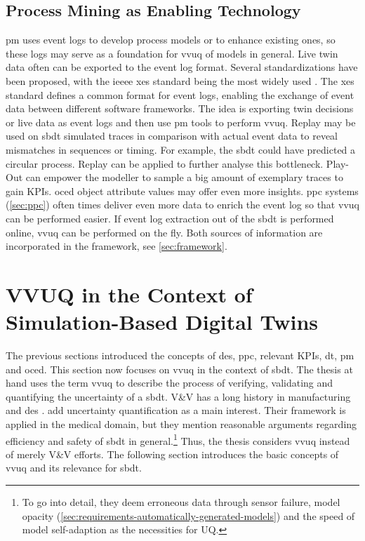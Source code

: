 \subsection{Process Mining as Enabling Technology}
\label{sec:process-mining-enabling-technology}

\gls{pm} uses event logs to develop process models or to enhance existing ones, so these logs may serve as a foundation for \gls{vvuq} of models in general. Live twin data often can be exported to the event log format. Several standardizations have been proposed, with the \gls{ieeee} \gls{xes} standard being the most widely used \autocite{van2016data}. The \gls{xes} standard defines a common format for event logs, enabling the exchange of event data between different software frameworks. The idea is exporting twin decisions or live data as event logs and then use \gls{pm} tools to perform \gls{vvuq}.
Replay may be used on \gls{sbdt} simulated traces in comparison with actual event data to reveal mismatches in sequences or timing. For example, the \gls{sbdt} could have predicted a circular process. Replay can be applied to further analyse this bottleneck. Play-Out can empower the modeller to sample a big amount of exemplary traces to gain KPIs. \gls{oced} object attribute values may offer even more insights.
\gls{ppc} systems (\autoref{sec:ppc}) often times deliver even more data to enrich the event log so that \gls{vvuq} can be performed easier. If event log extraction out of the \gls{sbdt} is performed online, \gls{vvuq} can be performed on the fly. Both sources of information are incorporated in the framework, see \autoref{sec:framework}.

\section{VVUQ in the Context of Simulation-Based Digital Twins}
\label{sec:vvuq-sbdt}

The previous sections introduced the concepts of \gls{des}, \gls{ppc}, relevant KPIs, \gls{dt}, \gls{pm} and \gls{oced}. This section now focuses on \gls{vvuq} in the context of \gls{sbdt}. The thesis at hand uses the term \gls{vvuq} to describe the process of verifying, validating and quantifying the uncertainty of a \gls{sbdt}. V\&V has a long history in manufacturing and \gls{des} \autocite{Bitencourt2023}. \Textcite{sel2025survey} add uncertainty quantification as a main interest. Their framework is applied in the medical domain, but they mention reasonable arguments regarding efficiency and safety of \gls{sbdt} in general.\footnote{To go into detail, they deem erroneous data through sensor failure, model opacity (\autoref{sec:requirements-automatically-generated-models}) and the speed of model self-adaption as the necessities for UQ.} Thus, the thesis considers \gls{vvuq} instead of merely V\&V efforts. The following section introduces the basic concepts of \gls{vvuq} and its relevance for \gls{sbdt}.


